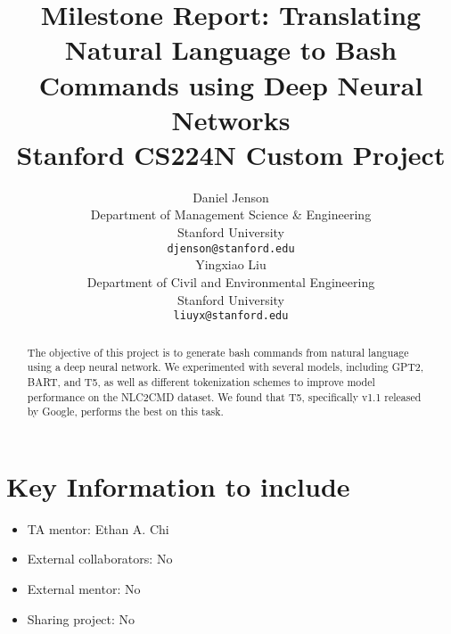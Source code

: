 \documentclass{article}
\title{
  Milestone Report: Translating Natural Language to Bash Commands using Deep Neural Networks \\
  \vspace{1em}
  \small{\normalfont Stanford CS224N Custom Project  }
}
\author{
 Daniel Jenson \\
  Department of Management Science \& Engineering \\
  Stanford University \\
  \texttt{djenson@stanford.edu} \\
  \And
  Yingxiao Liu \\
  Department of Civil and Environmental Engineering \\
  Stanford University \\
  \texttt{liuyx@stanford.edu} \\
}
\begin{document}
\maketitle

\begin{abstract}
	The objective of this project is to generate bash commands from natural
	language using a deep neural network. We experimented with several models,
	including GPT2, BART, and T5, as well as different tokenization schemes to
	improve model performance on the NLC2CMD dataset. We found that T5,
	specifically v1.1 released by Google, performs the best on this task.
\end{abstract}


\section{Key Information to include}
\begin{itemize}
	\item TA mentor: Ethan A. Chi
	\item External collaborators: No
	\item External mentor: No
	\item Sharing project: No
\end{itemize}

\end{document}
